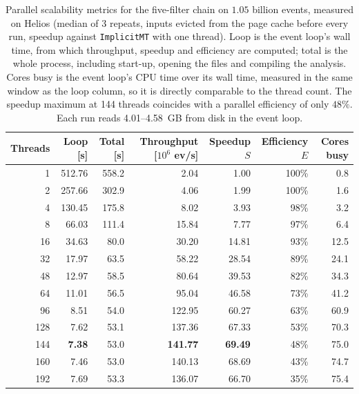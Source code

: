 \begin{table}[htbp]
\centering
\caption{Parallel scalability metrics for the five-filter chain on $1.05$ billion events, measured on Helios (median of 3 repeats, inputs evicted from the page cache before every run, speedup against \texttt{ImplicitMT} with one thread). Loop is the event loop's wall time, from which throughput, speedup and efficiency are computed; total is the whole process, including start-up, opening the files and compiling the analysis. Cores busy is the event loop's CPU time over its wall time, measured in the same window as the loop column, so it is directly comparable to the thread count. The speedup maximum at 144 threads coincides with a parallel efficiency of only $48\%$. Each run reads 4.01--4.58~GB from disk in the event loop.}
\label{tab:scalability-chain}
\setlength{\tabcolsep}{5pt}
\begin{tabular}{rrrrrrr}
\toprule
Threads & Loop [s] & Total [s] & Throughput [$10^6$ ev/s] & Speedup $S$ & Efficiency $E$ & Cores busy \\
\midrule
 1 & 512.76 & 558.2 & 2.04 & 1.00 & 100\% & 0.8 \\
 2 & 257.66 & 302.9 & 4.06 & 1.99 & 100\% & 1.6 \\
 4 & 130.45 & 175.8 & 8.02 & 3.93 & 98\% & 3.2 \\
 8 & 66.03 & 111.4 & 15.84 & 7.77 & 97\% & 6.4 \\
16 & 34.63 & 80.0 & 30.20 & 14.81 & 93\% & 12.5 \\
32 & 17.97 & 63.5 & 58.22 & 28.54 & 89\% & 24.1 \\
48 & 12.97 & 58.5 & 80.64 & 39.53 & 82\% & 34.3 \\
64 & 11.01 & 56.5 & 95.04 & 46.58 & 73\% & 41.2 \\
96 & 8.51 & 54.0 & 122.95 & 60.27 & 63\% & 60.9 \\
128 & 7.62 & 53.1 & 137.36 & 67.33 & 53\% & 70.3 \\
144 & \textbf{7.38} & 53.0 & \textbf{141.77} & \textbf{69.49} & 48\% & 75.0 \\
160 & 7.46 & 53.0 & 140.13 & 68.69 & 43\% & 74.7 \\
192 & 7.69 & 53.3 & 136.07 & 66.70 & 35\% & 75.4 \\
\bottomrule
\end{tabular}
\end{table}
